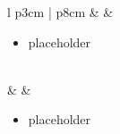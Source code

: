 \documentclass[10pt,usenames,dvipsnames,twoside]{report}
\begin{document}
\begin{center}
\begin{longtable}{l p{3cm} | p{8cm}}
			\midrule
			\textbullet &  &
			\begin{minipage}[t]{\linewidth}
				\vspace{-7pt}
				\begin{itemize}
					\item placeholder
				\end{itemize}
			\end{minipage} \\
			\midrule
			\textbullet &  &
			\begin{minipage}[t]{\linewidth}
				\vspace{-7pt}
				\begin{itemize}
					\item placeholder
				\end{itemize}
			\end{minipage} \\
			\bottomrule
		\end{longtable}
	\end{center}
\end{document}
